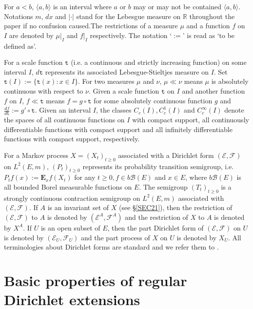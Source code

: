 \documentclass[a4paper]{amsart}
\theoremstyle{definition}
\theoremstyle{remark}
\numberwithin{equation}{section}
\begin{document}
For $a<b$, $\langle a, b\rangle$ is an interval where $a$ or $b$ may or may not be contained $\langle a, b\rangle$.
Notations $m$, $dx$ and $|\cdot|$ stand for the Lebesgue measure on $\mathbb{R}$ throughout the paper if no confusion caused.The restrictions of a measure $\mu$ and a function $f$ on $I$ are denoted by $\mu|_I$ and $f|_I$ respectively.
The notation `$:=$' is read as `to be defined as'.

For a scale function ${{\mathtt{t}}}$ (i.e. a continuous and strictly increasing function) on some interval $I$, $d{{\mathtt{t}}}$ represents its associated Lebesgue-Stieltjes measure on $I$. Set ${{\mathtt{t}}}(I):=\{{{\mathtt{t}}}(x):x\in I\}$. For two measures $\mu$ and $\nu$, $\mu\ll \nu$ means $\mu$ is absolutely continuous with respect to $\nu$. Given a scale function ${{\mathtt{t}}}$ on $I$ and another function $f$ on $I$, $f\ll {{\mathtt{t}}}$ means $f=g\circ {{\mathtt{t}}}$ for some absolutely continuous function $g$ and $\frac{df}{d{{\mathtt{t}}}}:=g'\circ {{\mathtt{t}}}$. Given an interval $I$,  the classes $C_c(I), C^1_c(I)$ and $C^\infty_c(I)$ denote the spaces of all continuous functions on $I$ with compact support, all continuously differentiable functions with compact support and all infinitely differentiable functions with compact support, respectively.

For a Markov process $X=(X_t)_{t\geq 0}$ associated with a Dirichlet form $({{\mathcal{E}}},{{\mathcal{F}}})$ on $L^2(E,m)$, $(P_t)_{t\geq 0}$ represents its probability transition semigroup, i.e. $P_tf(x):=\mathbf{E}_xf(X_t)$ for any $t\geq 0, f\in b\mathcal{B}(E)$ and $x\in E$, where $b\mathcal{B}(E)$ is all bounded Borel measurable functions on $E$. The semigroup $(T_t)_{t\geq 0}$ is a strongly continuous contraction semigroup on $L^2(E,m)$ associated with $({{\mathcal{E}}},{{\mathcal{F}}})$. If $A$ is an invariant set of $X$ (see \S\ref{SEC21}), then the restriction of $({{\mathcal{E}}},{{\mathcal{F}}})$ to $A$ is denoted by $({{\mathcal{E}}}^A,{{\mathcal{F}}}^A)$ and the restriction of $X$ to $A$ is denoted by $X^A$. If $U$ is an open subset of $E$, then the part Dirichlet form of $({{\mathcal{E}}},{{\mathcal{F}}})$ on $U$ is denoted by $({{\mathcal{E}}}_U,{{\mathcal{F}}}_U)$ and the part process of $X$ on $U$ is denoted by $X_U$.
All terminologies about Dirichlet forms are standard and we refer them to \cite{CF12, FOT11}.

\section{Basic properties of regular Dirichlet extensions}\label{SEC0}
\end{document}
